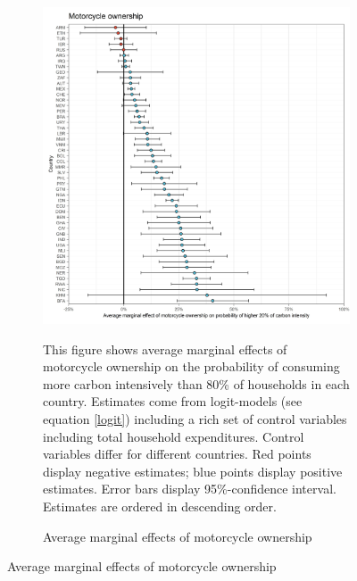  \begin{figure}[ht!]\ContinuedFloat
   \centering
   \begin{subfigure}[b]{\textwidth}
   \centering
   \caption{Average marginal effects of motorcycle ownership} \label{fig:Logit_ME_motorcycle}
   \includegraphics{1_Figures/Analysis_Logit_Models_Marginal_Effects/Average_Marginal_Effects_affected_upper_80_motorcycle.01_2017.jpg}
   \begin{subcaption2}
     This figure shows average marginal effects of motorcycle ownership on the probability of consuming more carbon intensively than 80\% of households in each country. Estimates come from logit-models (see equation \ref{logit}) including a rich set of control variables including total household expenditures. Control variables differ for different countries. Red points display negative estimates; blue points display positive estimates. Error bars display 95\%-confidence interval. Estimates are ordered in descending order.
   \end{subcaption2}
   \end{subfigure}
 \end{figure}
 \clearpage

